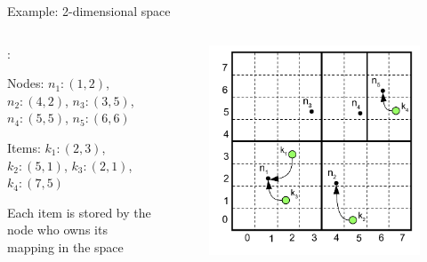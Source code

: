 \begin{frame}{Example: 2-dimensional space}

\begin{columns}
\begin{column}{0.5\textwidth}
:\\
\BI
\item Nodes: $n_1:(1, 2)$, $n_2:(4,2)$, $n_3:(3, 5)$, $n_4:(5,5)$, $n_5:(6,6)$
\item Items: $k_1:(2,3)$, $k_2:(5,1)$, $k_3:(2,1)$, $k_4:(7,5)$
\item Each item is stored by the node who owns its mapping in the space
\EI
\end{column}
\begin{column}{0.5\textwidth}
\begin{figure}
	\includegraphics[width=1.0\textwidth]{figs/10/can5}
\end{figure}
\end{column}
\end{columns}
		
\end{frame}	

